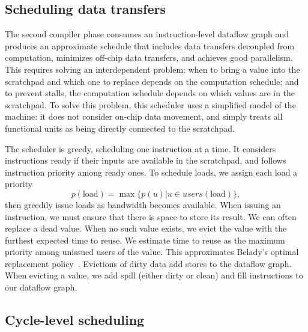 \subsection{Scheduling data transfers}
\label{sec:datatransfers}

The second compiler phase consumes an instruction-level dataflow graph and produces 
an approximate schedule that includes data transfers decoupled from computation,
minimizes off-chip data transfers, and achieves good parallelism.
This requires solving an interdependent problem: when to bring a value into the scratchpad and which one to replace
depends on the computation schedule; and to prevent stalls, the computation schedule depends on which values are in the scratchpad.
To solve this problem, this scheduler uses a simplified model of the machine:
it does not consider on-chip data movement, and simply treats all functional units 
as being directly connected to the scratchpad. %

The scheduler is greedy, scheduling one instruction at a time.
It considers instructions ready if their inputs are available in the scratchpad,
and follows instruction priority among ready ones.
To schedule loads, we assign each load a priority
\begin{equation*}
p(\text{load}) = \max \{ p(u) | u \in users(\text{load})\},
\end{equation*}
then greedily issue loads as bandwidth becomes available.
When issuing an instruction, we must ensure that there is space to store its result.
We can often replace a dead value. %
When no such value exists, we evict the value with the furthest expected time to reuse.
We estimate time to reuse as the maximum priority among unissued users of the value. 
This approximates Belady's optimal replacement policy~\cite{belady1966study}. 
Evictions of dirty data add stores to the dataflow graph.
When evicting a value, we add spill (either dirty or clean) and fill instructions to our dataflow graph. 

\subsection{Cycle-level scheduling}

